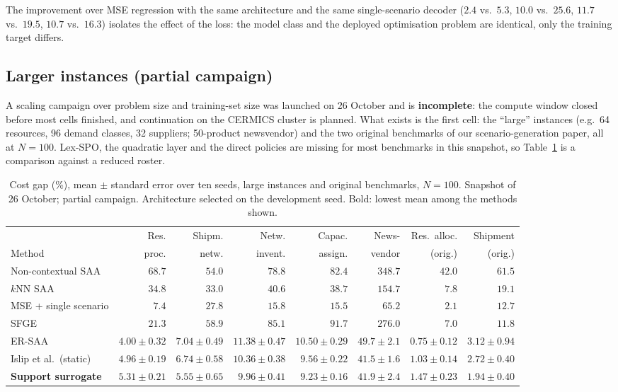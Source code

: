 \documentclass[11pt,a4paper]{article}
\theoremstyle{remark}
\begin{document}
The improvement over MSE regression with the same architecture and the same
single-scenario decoder ($2.4$ vs.\ $5.3$, $10.0$ vs.\ $25.6$, $11.7$ vs.\
$19.5$, $10.7$ vs.\ $16.3$) isolates the effect of the loss: the model class
and the deployed optimisation problem are identical, only the training target
differs.

\subsection{Larger instances (partial campaign)}

A scaling campaign over problem size and training-set size was launched on
26 October and is \textbf{incomplete}: the compute window closed before most
cells finished, and continuation on the CERMICS cluster is planned. What exists
is the first cell: the ``large'' instances (e.g.\ 64 resources, 96 demand
classes, 32 suppliers; 50-product newsvendor) and the two original benchmarks
of our scenario-generation paper, all at $N=100$. Lex-SPO, the quadratic layer
and the direct policies are missing for most benchmarks in this snapshot, so
Table~\ref{tab:scale} is a comparison against a reduced roster.

\begin{table}[h]
\centering\small
\caption{Cost gap (\%), mean $\pm$ standard error over ten seeds, large
instances and original benchmarks, $N=100$. Snapshot of 26 October; partial
campaign. Architecture selected on the development seed. Bold: lowest mean
among the methods shown.}\label{tab:scale}
\setlength{\tabcolsep}{2.5pt}\footnotesize
\begin{tabular}{@{}lrrrrrrr@{}}
\toprule
 & Res. & Shipm. & Netw. & Capac. & News- & Res.\ alloc. & Shipment\\
Method & proc. & netw. & invent. & assign. & vendor & (orig.) & (orig.)\\
\midrule
Non-contextual SAA & $68.7$ & $54.0$ & $78.8$ & $82.4$ & $348.7$ & $42.0$ & $61.5$\\
$k$NN SAA & $34.8$ & $33.0$ & $40.6$ & $38.7$ & $154.7$ & $7.8$ & $19.1$\\
MSE + single scenario & $7.4$ & $27.8$ & $15.8$ & $15.5$ & $65.2$ & $2.1$ & $12.7$\\
SFGE & $21.3$ & $58.9$ & $85.1$ & $91.7$ & $276.0$ & $7.0$ & $11.8$\\
ER-SAA & $\mathbf{4.00\pm0.32}$ & $7.04\pm0.49$ & $11.38\pm0.47$ & $10.50\pm0.29$ & $49.7\pm2.1$ & $\mathbf{0.75\pm0.12}$ & $3.12\pm0.94$\\
Islip et al.\ (static) & $4.96\pm0.19$ & $6.74\pm0.58$ & $10.36\pm0.38$ & $9.56\pm0.22$ & $41.5\pm1.6$ & $1.03\pm0.14$ & $2.72\pm0.40$\\
\midrule
\textbf{Support surrogate} & $5.31\pm0.21$ & $\mathbf{5.55\pm0.65}$ & $\mathbf{9.96\pm0.41}$ & $\mathbf{9.23\pm0.16}$ & $41.9\pm2.4$ & $1.47\pm0.23$ & $\mathbf{1.94\pm0.40}$\\
\bottomrule
\end{tabular}
\end{table}
\end{document}
